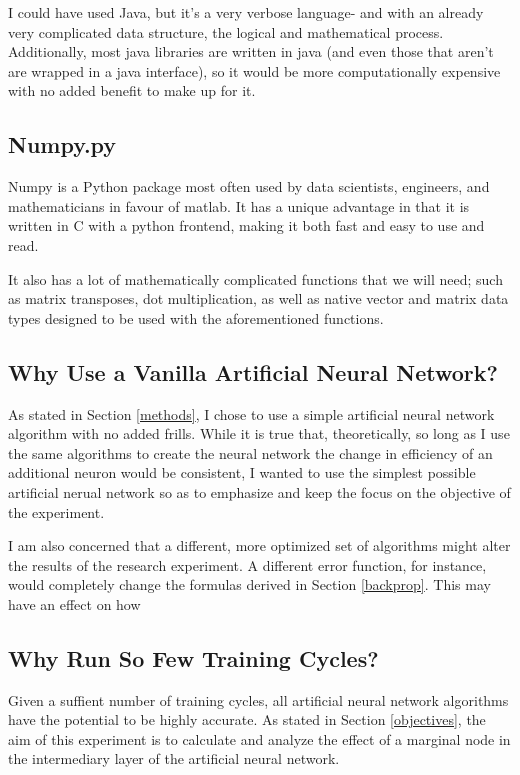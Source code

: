\documentclass[12pt]{article}
\begin{document}
I could have used Java, but it's a very verbose language- and with an already very complicated data structure, the logical and mathematical process. Additionally, most java libraries are written in java (and even those that aren't are wrapped in a java interface), so it would be more computationally expensive with no added benefit to make up for it.

\subsection{Numpy.py}

Numpy is a Python package most often used by data scientists, engineers, and mathematicians in favour of matlab. It has a unique advantage in that it is written in C with a python frontend, making it both fast and easy to use and read.

It also has a lot of mathematically complicated functions that we will need; such as matrix transposes, dot multiplication, as well as native vector and matrix data types designed to be used with the aforementioned functions.

\subsection{Why Use a Vanilla Artificial Neural Network?}

As stated in Section \ref{methods}, I chose to use a simple artificial neural network algorithm with no added frills. While it is true that, theoretically, so long as I use the same algorithms to create the neural network the change in efficiency of an additional neuron would be consistent, I wanted to use the simplest possible artificial nerual network so as to emphasize and keep the focus on the objective of the experiment.

I am also concerned that a different, more optimized set of algorithms might alter the results of the research experiment. A different error function, for instance, would completely change the formulas derived in Section \ref{backprop}. This may have an effect on how

\subsection{Why Run So Few Training Cycles?}

Given a suffient number of training cycles, all artificial neural network algorithms have the potential to be highly accurate. As stated in Section \ref{objectives}, the aim of this experiment is to calculate and analyze the effect of a marginal node in the intermediary layer of the artificial neural network.
\end{document}
